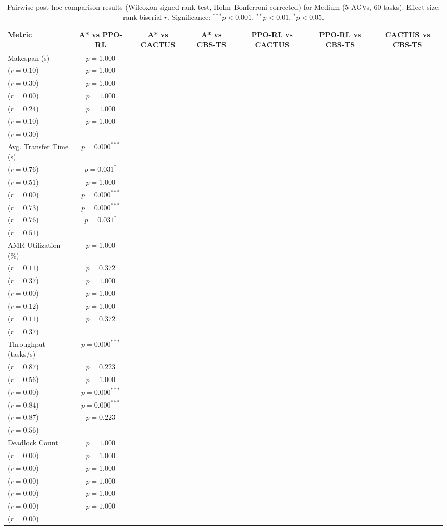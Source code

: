 \documentclass[review]{elsarticle}
\begin{document}
\begin{table}[htbp]
\centering
\caption{Pairwise post-hoc comparison results (Wilcoxon signed-rank test, Holm--Bonferroni corrected) for Medium (5 AGVs, 60 tasks). Effect size: rank-biserial $r$. Significance: ${}^{***}p<0.001$, ${}^{**}p<0.01$, ${}^{*}p<0.05$.}
\label{tab:significance}
\small
\begin{tabular}{@{}lcccccc@{}}
\toprule
\textbf{Metric} & \textbf{A* vs PPO-RL} & \textbf{A* vs CACTUS} & \textbf{A* vs CBS-TS} & \textbf{PPO-RL vs CACTUS} & \textbf{PPO-RL vs CBS-TS} & \textbf{CACTUS vs CBS-TS} \\
\midrule
Makespan (s) & $p=1.000$\\($r=0.10$) & $p=1.000$\\($r=0.30$) & $p=1.000$\\($r=0.00$) & $p=1.000$\\($r=0.24$) & $p=1.000$\\($r=0.10$) & $p=1.000$\\($r=0.30$) \\
Avg. Transfer Time (s) & $p=0.000^{***}$\\($r=0.76$) & $p=0.031^{*}$\\($r=0.51$) & $p=1.000$\\($r=0.00$) & $p=0.000^{***}$\\($r=0.73$) & $p=0.000^{***}$\\($r=0.76$) & $p=0.031^{*}$\\($r=0.51$) \\
AMR Utilization (\%) & $p=1.000$\\($r=0.11$) & $p=0.372$\\($r=0.37$) & $p=1.000$\\($r=0.00$) & $p=1.000$\\($r=0.12$) & $p=1.000$\\($r=0.11$) & $p=0.372$\\($r=0.37$) \\
Throughput (tasks/s) & $p=0.000^{***}$\\($r=0.87$) & $p=0.223$\\($r=0.56$) & $p=1.000$\\($r=0.00$) & $p=0.000^{***}$\\($r=0.84$) & $p=0.000^{***}$\\($r=0.87$) & $p=0.223$\\($r=0.56$) \\
Deadlock Count & $p=1.000$\\($r=0.00$) & $p=1.000$\\($r=0.00$) & $p=1.000$\\($r=0.00$) & $p=1.000$\\($r=0.00$) & $p=1.000$\\($r=0.00$) & $p=1.000$\\($r=0.00$) \\

\end{tabular}
\end{table}
\end{document}
